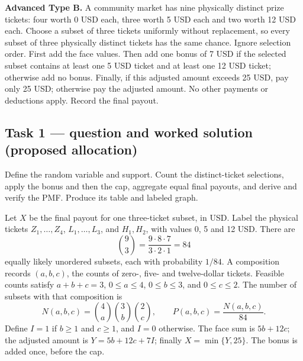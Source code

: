 \textbf{Advanced Type B.} A community market has nine physically distinct prize tickets: four worth 0 USD each, three worth 5 USD each and two worth 12 USD each. Choose a subset of three tickets uniformly without replacement, so every subset of three physically distinct tickets has the same chance. Ignore selection order. First add the face values. Then add one bonus of 7 USD if the selected subset contains at least one 5 USD ticket and at least one 12 USD ticket; otherwise add no bonus. Finally, if this adjusted amount exceeds 25 USD, pay only 25 USD; otherwise pay the adjusted amount. No other payments or deductions apply. Record the final payout.

\subsection*{Task 1 --- question and worked solution (proposed allocation) }
\label{sol:q6t1}

Define the random variable and support. Count the distinct-ticket selections, apply the bonus and then the cap, aggregate equal final payouts, and derive and verify the PMF. Produce its table and labeled graph.

Let $X$ be the final payout for one three-ticket subset, in USD. Label the physical tickets $Z_1,\ldots,Z_4$, $L_1,\ldots,L_3$, and $H_1,H_2$, with values 0, 5 and 12 USD. There are
\[
\binom93=\frac{9\cdot8\cdot7}{3\cdot2\cdot1}=84
\]
equally likely unordered subsets, each with probability $1/84$. A composition records $(a,b,c)$, the counts of zero-, five- and twelve-dollar tickets. Feasible counts satisfy $a+b+c=3$, $0\leq a\leq4$, $0\leq b\leq3$, and $0\leq c\leq2$. The number of subsets with that composition is
\[
N(a,b,c)=\binom4a\binom3b\binom2c,\qquad P(a,b,c)=\frac{N(a,b,c)}{84}.
\]
Define $I=1$ if $b\geq1$ and $c\geq1$, and $I=0$ otherwise. The face sum is $5b+12c$; the adjusted amount is $Y=5b+12c+7I$; finally $X=\min\{Y,25\}$. The bonus is added once, before the cap.

\begingroup\renewcommand{\arraystretch}{1.35}

